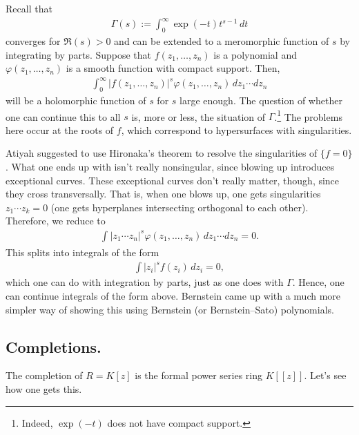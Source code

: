 \documentclass [11 pt, oneside] {article}
\begin{document}
\begin{example}\label{}\text{}
Recall that
\begin{align*}
	\Gamma(s) :=  \int_{0}^{\infty}\exp(-t)t^{s-1}  \, dt
\end{align*}
	converges for $\Re (s)>0$ and can be extended to a meromorphic function of $s$ by integrating by parts. Suppose that $f(z_1,\hdots,z_n)$ is a polynomial and $\varphi(z_1,\hdots, z_n)$ is a smooth function with compact support. Then,
	\begin{align*}
		\int_{0}^{\infty} \left\lvert f(z_1,\hdots, z_n) \right\rvert ^s\varphi(z_1,\hdots,z_n)  \, dz_1\cdots dz_n 
	\end{align*}
	will be a holomorphic function of $s$ for $s$ large enough. The question of whether one can continue this to all $s$ is, more or less, the situation of $\Gamma$.\footnote{Indeed, $\exp({-t})$ does not have compact support.} The problems here occur at the roots of $f$, which correspond to hypersurfaces with singularities.
	
	Atiyah suggested to use Hironaka's theorem to resolve the singularities of $\{f=0\}$. What one ends up with isn't really nonsingular, since blowing up introduces exceptional curves. These exceptional curves don't really matter, though, since they cross transversally. That is, when one blows up, one gets singularities $z_1\cdots z_k=0$ (one gets hyperplanes intersecting orthogonal to each other). Therefore, we reduce to 
	\begin{align*}
		\int_{}^{}  \left\lvert z_1\cdots z_n \right\rvert^s\varphi(z_1,\hdots,z_n)   \, dz_1\cdots dz_n =0.
	\end{align*}
	This splits into integrals of the form
	\begin{align*}
		\int\left\lvert z_i \right\rvert ^sf(z_i)\, dz_i=0,
	\end{align*}
	which one can do with integration by parts, just as one does with $\Gamma$. Hence, one can continue integrals of the form above. Bernstein came up with a much more simpler way of showing this using Bernstein (or Bernstein--Sato) polynomials.
\end{example}

\subsection{Completions.}
The completion of $R=K[z]$ is the formal power series ring $K[\![z]\!]$. Let's see how one gets this.
\end{document}
